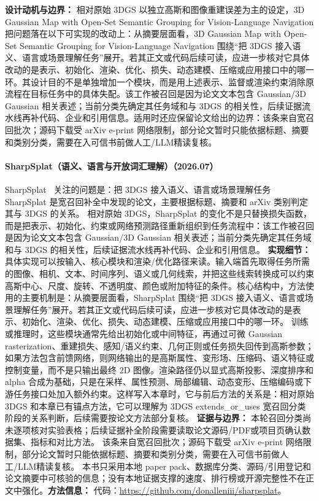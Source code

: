 \textbf{设计动机与边界：} 相对原始 3DGS 以独立高斯和图像重建误差为主的设定，3D Gaussian Map with Open-Set Semantic Grouping for Vision-Language Navigation 把问题落在以下可实现的改动上：从摘要层面看，3D Gaussian Map with Open-Set Semantic Grouping for Vision-Language Navigation 围绕“把 3DGS 接入语义、语言或场景理解任务”展开。若其正文或代码后续可读，应进一步核对它具体改动的是表示、初始化、渲染、优化、损失、动态建模、压缩或应用接口中的哪一环。其设计目的不是单独增加一个模块，而是用上述表示、监督或渲染约束消除原流程在目标任务中的具体失配。该工作被召回是因为论文文本包含 Gaussian/3D Gaussian 相关表述；当前分类先确定其任务域和与 3DGS 的相关性，后续证据流水线再补代码、企业和引用信息。适用时还应保留论文给出的边界：该条来自宽召回批次；源码下载受 arXiv e-print 网络限制，部分论文暂时只能依据标题、摘要和类别分类，需要在入可信书前做人工/LLM精读复核。
\paragraph{SharpSplat（语义、语言与开放词汇理解）（2026.07）}
SharpSplat~\cite{2607_03872} 关注的问题是：把 3DGS 接入语义、语言或场景理解任务 SharpSplat 是宽召回补全中发现的论文，主要根据标题、摘要和 arXiv 类别判定其与 3DGS 的关系。
相对原始 3DGS，SharpSplat 的变化不是只替换损失函数，而是把表示、初始化、约束或网络预测路径重新组织到任务流程中：该工作被召回是因为论文文本包含 Gaussian/3D Gaussian 相关表述；当前分类先确定其任务域和与 3DGS 的相关性，后续证据流水线再补代码、企业和引用信息。
\textbf{实现细节：} 具体实现可以按输入、核心模块和渲染/优化路径来读。输入端首先取得任务所需的图像、相机、文本、时间序列、语义或几何线索，并把这些线索转换成可以约束高斯中心、尺度、旋转、不透明度、颜色或附加特征的条件。核心结构中，方法使用的主要机制是：从摘要层面看，SharpSplat 围绕“把 3DGS 接入语义、语言或场景理解任务”展开。若其正文或代码后续可读，应进一步核对它具体改动的是表示、初始化、渲染、优化、损失、动态建模、压缩或应用接口中的哪一环。 训练或推理时，这些模块通常先给出初始化或中间特征，再通过可微 Gaussian rasterization、重建损失、感知/语义约束、几何正则或任务损失回传到高斯参数；如果方法包含前馈网络，则网络输出的是高斯属性、变形场、压缩码、语义特征或控制变量，而不是只输出最终 2D 图像。渲染路径仍以显式高斯投影、深度排序和 alpha 合成为基础，只是在采样、属性预测、局部编辑、动态变形、压缩编码或下游任务接口处加入额外约束。这样写入本章时，它与前后方法的关系是：相对原始 3DGS 和本章已有锚点方法，它可以理解为 3DGS extends\_or\_uses 宽召回分类阶段的关系判断，后续需要按论文方法部分复核。
\textbf{证据与边界：} 本轮召回分类尚未逐项核对实验表格；后续证据补全阶段需要读取论文源码/PDF或项目页确认数据集、指标和对比方法。 该条来自宽召回批次；源码下载受 arXiv e-print 网络限制，部分论文暂时只能依据标题、摘要和类别分类，需要在入可信书前做人工/LLM精读复核。 本书只采用本地 paper pack、数据库分类、源码/引用登记和论文摘要中可核验的信息；没有本地证据支撑的速度、排行榜或开源完整性不在正文中强化。\textbf{方法信息：} 代码：\url{https://github.com/donalleniii/sharpsplat}。


